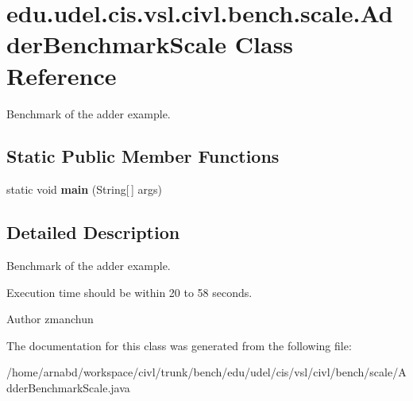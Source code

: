 \hypertarget{classedu_1_1udel_1_1cis_1_1vsl_1_1civl_1_1bench_1_1scale_1_1AdderBenchmarkScale}{}\section{edu.\+udel.\+cis.\+vsl.\+civl.\+bench.\+scale.\+Adder\+Benchmark\+Scale Class Reference}
\label{classedu_1_1udel_1_1cis_1_1vsl_1_1civl_1_1bench_1_1scale_1_1AdderBenchmarkScale}


Benchmark of the adder example.  


\subsection*{Static Public Member Functions}
\begin{DoxyCompactItemize}
\item 
\hypertarget{classedu_1_1udel_1_1cis_1_1vsl_1_1civl_1_1bench_1_1scale_1_1AdderBenchmarkScale_a033a8c01bf79594cef4adba1306a30ba}{}static void {\bfseries main} (String\mbox{[}$\,$\mbox{]} args)\label{classedu_1_1udel_1_1cis_1_1vsl_1_1civl_1_1bench_1_1scale_1_1AdderBenchmarkScale_a033a8c01bf79594cef4adba1306a30ba}

\end{DoxyCompactItemize}


\subsection{Detailed Description}
Benchmark of the adder example. 

Execution time should be within 20 to 58 seconds.

\begin{DoxyAuthor}{Author}
zmanchun 
\end{DoxyAuthor}


The documentation for this class was generated from the following file\+:\begin{DoxyCompactItemize}
\item 
/home/arnabd/workspace/civl/trunk/bench/edu/udel/cis/vsl/civl/bench/scale/Adder\+Benchmark\+Scale.\+java\end{DoxyCompactItemize}
